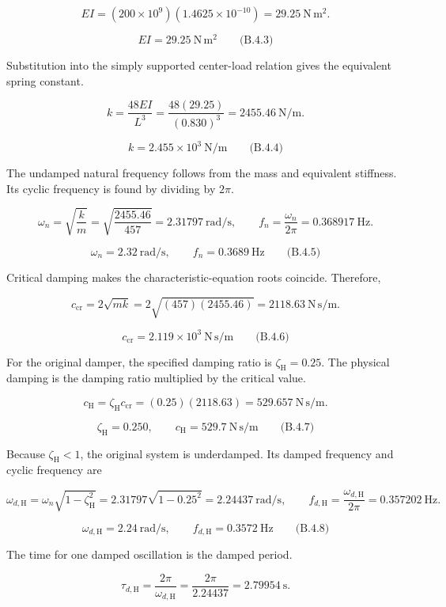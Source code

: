 \[
EI=(200\times10^9)(1.4625\times10^{-10})
 =29.25\ \mathrm{N\,m^2}.
\]

\[
\boxed{EI=29.25\ \mathrm{N\,m^2}}
\qquad\text{(B.4.3)}
\]

Substitution into the simply supported center-load relation gives the equivalent spring constant.

\[
k=\frac{48EI}{L^3}
 =\frac{48(29.25)}{(0.830)^3}
 =2455.46\ \mathrm{N/m}.
\]

\[
\boxed{k=2.455\times10^3\ \mathrm{N/m}}
\qquad\text{(B.4.4)}
\]

The undamped natural frequency follows from the mass and equivalent stiffness. Its cyclic frequency is found by dividing by $2\pi$.

\[
\omega_n=\sqrt{\frac{k}{m}}=\sqrt{\frac{2455.46}{457}}=2.31797\ \mathrm{rad/s},
\qquad
f_n=\frac{\omega_n}{2\pi}=0.368917\ \mathrm{Hz}.
\]

\[
\boxed{\omega_n=2.32\ \mathrm{rad/s},\qquad f_n=0.3689\ \mathrm{Hz}}
\qquad\text{(B.4.5)}
\]

Critical damping makes the characteristic-equation roots coincide. Therefore,

\[
c_{\mathrm{cr}}=2\sqrt{mk}=2\sqrt{(457)(2455.46)}
 =2118.63\ \mathrm{N\,s/m}.
\]

\[
\boxed{c_{\mathrm{cr}}=2.119\times10^3\ \mathrm{N\,s/m}}
\qquad\text{(B.4.6)}
\]

For the original damper, the specified damping ratio is $\zeta_{\mathrm{H}}=0.25$. The physical damping is the damping ratio multiplied by the critical value.

\[
c_{\mathrm{H}}=\zeta_{\mathrm{H}}c_{\mathrm{cr}}
 =(0.25)(2118.63)=529.657\ \mathrm{N\,s/m}.
\]

\[
\boxed{\zeta_{\mathrm{H}}=0.250,\qquad c_{\mathrm{H}}=529.7\ \mathrm{N\,s/m}}
\qquad\text{(B.4.7)}
\]

Because $\zeta_{\mathrm{H}}<1$, the original system is underdamped. Its damped frequency and cyclic frequency are

\[
\omega_{d,\mathrm{H}}=\omega_n\sqrt{1-\zeta_{\mathrm{H}}^2}
 =2.31797\sqrt{1-0.25^2}=2.24437\ \mathrm{rad/s},
\qquad
f_{d,\mathrm{H}}=\frac{\omega_{d,\mathrm{H}}}{2\pi}=0.357202\ \mathrm{Hz}.
\]

\[
\boxed{\omega_{d,\mathrm{H}}=2.24\ \mathrm{rad/s},\qquad f_{d,\mathrm{H}}=0.3572\ \mathrm{Hz}}
\qquad\text{(B.4.8)}
\]

The time for one damped oscillation is the damped period.

\[
\tau_{d,\mathrm{H}}=\frac{2\pi}{\omega_{d,\mathrm{H}}}
 =\frac{2\pi}{2.24437}=2.79954\ \mathrm{s}.
\]

